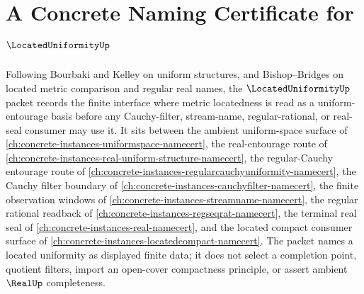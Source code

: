 \chapter{A Concrete Naming Certificate for $\LocatedUniformityUp$}
\label{ch:concrete-instances-located-uniformity-namecert}

Following Bourbaki and Kelley on uniform structures, and Bishop--Bridges on
located metric comparison and regular real names, the $\LocatedUniformityUp$
packet records the finite interface where metric locatedness is read as a
uniform-entourage basis before any Cauchy-filter, stream-name, regular-rational,
or real-seal consumer may use it. It sits between the ambient uniform-space
surface of \autoref{ch:concrete-instances-uniformspace-namecert}, the
real-entourage route of \autoref{ch:concrete-instances-real-uniform-structure-namecert},
the regular-Cauchy entourage route of
\autoref{ch:concrete-instances-regularcauchyuniformity-namecert}, the Cauchy
filter boundary of \autoref{ch:concrete-instances-cauchyfilter-namecert}, the
finite observation windows of \autoref{ch:concrete-instances-streamname-namecert},
the regular rational readback of \autoref{ch:concrete-instances-regseqrat-namecert},
the terminal real seal of \autoref{ch:concrete-instances-real-namecert}, and the
located compact consumer surface of \autoref{ch:concrete-instances-locatedcompact-namecert}.
The packet names a located uniformity as displayed finite data; it does not
select a completion point, quotient filters, import an open-cover compactness
principle, or assert ambient $\RealUp$ completeness.

